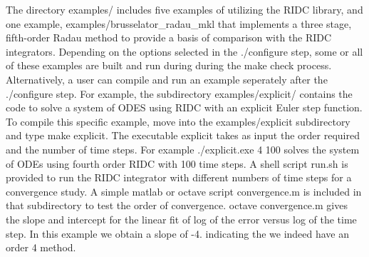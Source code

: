 The directory {\ttfamily examples/} includes five examples of utilizing the R\+I\+D\+C library, and one example, {\ttfamily examples/brusselator\+\_\+radau\+\_\+mkl} that implements a three stage, fifth-\/order Radau method to provide a basis of comparison with the R\+I\+D\+C integrators. Depending on the options selected in the {\ttfamily ./configure} step, some or all of these examples are built and run during during the {\ttfamily make check} process. Alternatively, a user can compile and run an example seperately after the {\ttfamily ./configure} step. For example, the subdirectory {\ttfamily examples/explicit/} contains the code to solve a system of O\+D\+E\+S using R\+I\+D\+C with an explicit Euler step function. To compile this specific example, move into the {\ttfamily examples/explicit} subdirectory and type {\ttfamily make explicit}. The executable {\ttfamily explicit} takes as input the order required and the number of time steps. For example {\ttfamily ./explicit.exe 4 100} solves the system of O\+D\+Es using fourth order R\+I\+D\+C with 100 time steps. A shell script {\ttfamily run.\+sh} is provided to run the R\+I\+D\+C integrator with different numbers of time steps for a convergence study. A simple matlab or octave script {\ttfamily convergence.\+m} is included in that subdirectory to test the order of convergence. {\ttfamily octave convergence.\+m} gives the slope and intercept for the linear fit of log of the error versus log of the time step. In this example we obtain a slope of -\/4. indicating the we indeed have an order 4 method. 